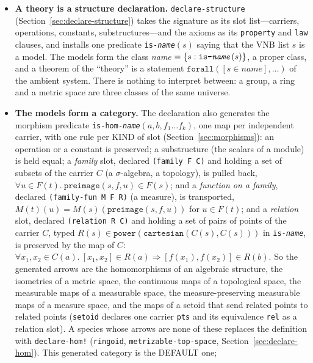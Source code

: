 \begin{itemize}
\item \textbf{A theory is a structure declaration.}  \texttt{declare-structure}
  (Section~\ref{sec:declare-structure}) takes the signature as its slot
  list---carriers, operations, constants, substructures---and the axioms as its
  \texttt{property} and \texttt{law} clauses, and installs one predicate
  \texttt{is-\textit{name}}$(s)$ saying that the VNB list $s$ is a model.
  The models form the class \textit{name} $= \{s : \texttt{is-\textit{name}}(s)\}$,
  a proper class, and a theorem of the ``theory'' is a statement
  $\texttt{forall}([s \in \textit{name}], \ldots)$ of the ambient system.
  There is nothing to interpret between: a group, a ring and a metric space are
  three classes of the same universe.

\item \textbf{The models form a category.}  The declaration also generates the
  morphism predicate \texttt{is-hom-\textit{name}}$(a, b, f_1 \ldots f_k)$, one
  map per independent carrier, with one rule per KIND of slot
  (Section~\ref{sec:morphisms}): an operation or a constant is preserved; a
  substructure (the scalars of a module) is held equal; a \emph{family} slot,
  declared \texttt{(family F C)} and holding a set of subsets of the carrier
  $C$ (a $\sigma$-algebra, a topology), is pulled back,
  $\forall u \in F(t).\ \mathtt{preimage}(s, f, u) \in F(s)$; and a
  \emph{function on a family}, declared \texttt{(family-fun M F R)} (a
  measure), is transported, $M(t)(u) = M(s)(\mathtt{preimage}(s, f, u))$ for
  $u \in F(t)$; and a \emph{relation} slot, declared \texttt{(relation R C)}
  and holding a set of pairs of points of the carrier $C$, typed
  $R(s) \in \mathtt{power}(\mathtt{cartesian}(C(s), C(s)))$ in
  \texttt{is-\textit{name}}, is preserved by the map of $C$:
  $\forall x_1, x_2 \in C(a).\ [x_1, x_2] \in R(a) \Rightarrow [f(x_1), f(x_2)] \in R(b)$.
  So the generated arrows are the homomorphisms of an algebraic
  structure, the isometries of a metric space, the continuous maps of a
  topological space, the measurable maps of a measurable space, the
  measure-preserving measurable maps of a measure space, and the maps of a
  setoid that send related points to related points (\texttt{setoid} declares
  one carrier \texttt{pts} and its equivalence \texttt{rel} as a relation
  slot).  A species whose arrows
  are none of these replaces the definition with \texttt{declare-hom!}
  (\texttt{ringoid}, \texttt{metrizable-top-space},
  Section~\ref{sec:declare-hom}).  This generated category is the DEFAULT one;

\end{itemize}

